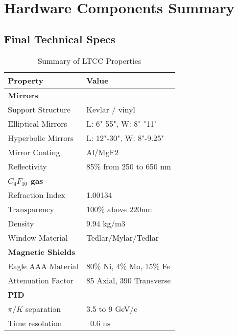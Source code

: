 \section{Hardware Components Summary}


\subsection{Final Technical Specs}


\begin{table}[h]
	\begin{center}
		\begin{tabular}{| l | l |}
			\hline \hline
			Property                 & Value \\
			\hline
			{\bf Mirrors}            &                               \\
			Support Structure        & Kevlar / vinyl                \\
			Elliptical Mirrors       & L: 6"-55", W: 8"-"11"         \\
			Hyperbolic Mirrors       & L: 12"-30", W: 8"-9.25"       \\
			Mirror Coating           & Al/MgF2                       \\
			Reflectivity             & 85\% from 250 to 650 nm       \\
			{\bf $C_4F_{10}$ gas}    &                               \\
			Refraction Index         & 1.00134                       \\
			Transparency             & 100\% above 220nm             \\
			Density                  & 9.94 kg/m3                    \\
			Window Material          & Tedlar/Mylar/Tedlar           \\
			{\bf Magnetic Shields}   &                               \\
			Eagle AAA Material       & 80\% Ni, 4\% Mo, 15\% Fe      \\
			Attenuation Factor       &  85 Axial, 390 Transverse     \\
			{\bf PID}                &                               \\
			$\pi/K$ separation       &  3.5 to 9 GeV/c               \\
			Time resolution          &  ~0.6 ns                      \\
			\hline \hline
		\end{tabular}
	\end{center}
\caption{Summary of LTCC Properties}\label{tab:ltccProperties}
\end{table}

